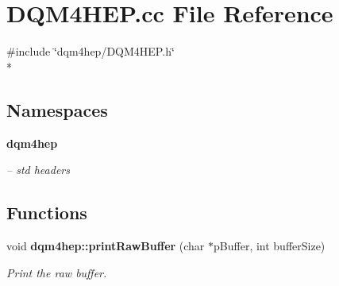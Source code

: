 \section{D\+Q\+M4\+H\+E\+P.\+cc File Reference}
\label{DQM4HEP_8cc}
{\ttfamily \#include \char`\"{}dqm4hep/\+D\+Q\+M4\+H\+E\+P.\+h\char`\"{}}\\*
\subsection*{Namespaces}
\begin{DoxyCompactItemize}
\item 
 {\bf dqm4hep}
\begin{DoxyCompactList}\small\item\em -- std headers \end{DoxyCompactList}\end{DoxyCompactItemize}
\subsection*{Functions}
\begin{DoxyCompactItemize}
\item 
void {\bf dqm4hep\+::print\+Raw\+Buffer} (char $\ast$p\+Buffer, int buffer\+Size)
\begin{DoxyCompactList}\small\item\em Print the raw buffer. \end{DoxyCompactList}\end{DoxyCompactItemize}
